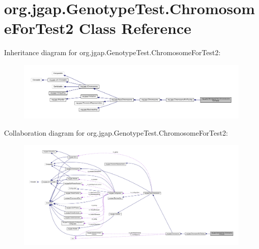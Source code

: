 \hypertarget{classorg_1_1jgap_1_1_genotype_test_1_1_chromosome_for_test2}{\section{org.\-jgap.\-Genotype\-Test.\-Chromosome\-For\-Test2 Class Reference}
\label{classorg_1_1jgap_1_1_genotype_test_1_1_chromosome_for_test2}
}


Inheritance diagram for org.\-jgap.\-Genotype\-Test.\-Chromosome\-For\-Test2\-:
\nopagebreak
\begin{figure}[H]
\begin{center}
\leavevmode
\includegraphics[width=350pt]{classorg_1_1jgap_1_1_genotype_test_1_1_chromosome_for_test2__inherit__graph}
\end{center}
\end{figure}


Collaboration diagram for org.\-jgap.\-Genotype\-Test.\-Chromosome\-For\-Test2\-:
\nopagebreak
\begin{figure}[H]
\begin{center}
\leavevmode
\includegraphics[width=350pt]{classorg_1_1jgap_1_1_genotype_test_1_1_chromosome_for_test2__coll__graph}
\end{center}
\end{figure}

